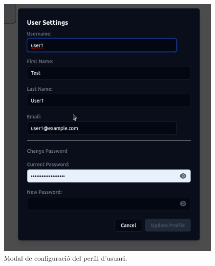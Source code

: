 \begin{figure}[H]
    \centering
    \begin{minipage}{0.48\textwidth}
        \centering
        \includegraphics[width=\linewidth]{Figures/ui-web/user_settings_dialog.png}
        \caption{Modal de configuració del perfil d'usuari.}
        \label{fig:react-user-settings-impl}
    \end{minipage}\hfill
    \begin{minipage}{0.48\textwidth}
        \centering

\end{minipage}
\end{figure}
